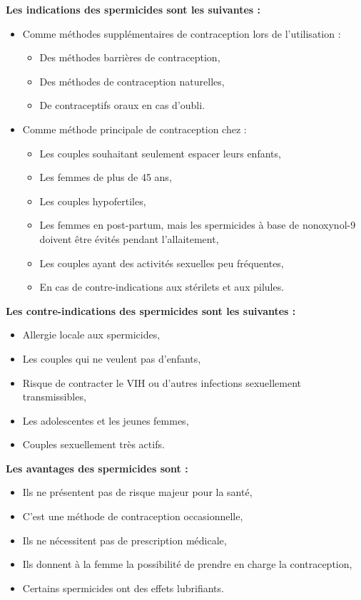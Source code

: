 \noindent \textbf{Les indications des spermicides sont les suivantes :}
\begin{itemize}[label={$\bullet$}, align=right]
  \item Comme méthodes supplémentaires de contraception lors de l’utilisation :
  \begin{itemize}[label={$\circ$}]
    \item Des méthodes barrières de contraception,
    \item Des méthodes de contraception naturelles, 
    \item De contraceptifs oraux en cas d’oubli.
  \end{itemize}  

  \item Comme méthode principale de contraception chez :
  \begin{itemize}[label={$\circ$}]
    \item Les couples souhaitant seulement espacer leurs enfants,
    \item	Les femmes de plus de 45 ans,
    \item Les couples hypofertiles,
    \item Les femmes en post-partum, mais les spermicides à base de nonoxynol-9 doivent être évités pendant l’allaitement,
    \item Les couples ayant des activités sexuelles peu fréquentes,
    \item	En cas de contre-indications aux stérilets et aux pilules.  
  \end{itemize}
\end{itemize}\vspace*{1em}

\noindent \textbf{Les contre-indications des spermicides sont les suivantes :}
\begin{itemize}[label={$\bullet$}, align=right]
  \item Allergie locale aux spermicides,
  \item	Les couples qui ne veulent pas d’enfants,
  \item	Risque de contracter le VIH ou d’autres infections sexuellement transmissibles,
  \item	Les adolescentes et les jeunes femmes,
  \item	Couples sexuellement très actifs. 
\end{itemize} \vspace*{1em}

\noindent \textbf{Les avantages des spermicides sont : }
\begin{itemize}[label={$\bullet$}, align=right]
  \item Ils ne présentent pas de risque majeur pour la santé,
  \item C’est une méthode de contraception occasionnelle,
  \item Ils ne nécessitent pas de prescription médicale, 
  \item Ils donnent à la femme la possibilité de prendre en charge la contraception, 
  \item Certains spermicides ont des effets lubrifiants.
\end{itemize} \vspace*{1em}

